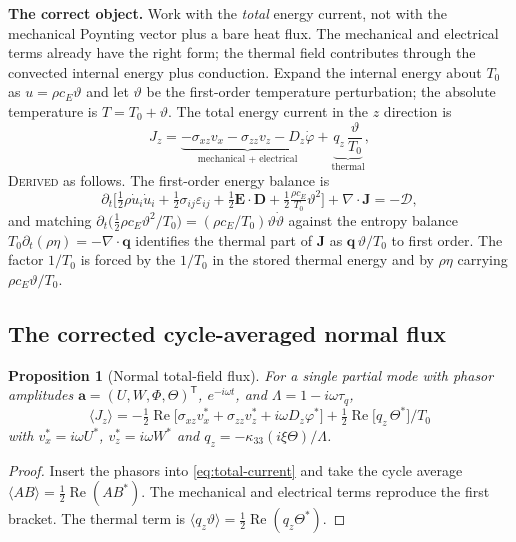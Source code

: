\documentclass[11pt]{article}
\newcommand{\s}{\sigma}
\newcommand{\eps}{\varepsilon}
\newcommand{\bth}{\vartheta}
\newcommand{\D}{\bm{D}}
\newcommand{\E}{\bm{E}}
\newcommand{\bq}{\bm{q}}
\newcommand{\Lam}{\Lambda}
\theoremstyle{plain}
\newtheorem{proposition}{Proposition}
\begin{document}
\textbf{The correct object.} Work with the \emph{total} energy current, not with
the mechanical Poynting vector plus a bare heat flux. The mechanical and
electrical terms already have the right form; the thermal field contributes
through the convected internal energy plus conduction. Expand the internal energy
about $T_0$ as $u = \rho c_E\bth$ and let $\bth$ be the first-order temperature
perturbation; the absolute temperature is $T=T_0+\bth$. The total energy current
in the $z$ direction is
\begin{equation}
  J_z = \underbrace{-\s_{xz}v_x-\s_{zz}v_z-D_z\dot\varphi}_{\text{mechanical + electrical}}
      + \underbrace{q_z\,\frac{\bth}{T_0}}_{\text{thermal}},
  \label{eq:total-current}
\end{equation}
\textsc{Derived} as follows. The first-order energy balance is
\begin{equation}
  \partial_t\Big[\tfrac12\rho\dot u_i\dot u_i+\tfrac12\s_{ij}\eps_{ij}
    +\tfrac12\E\cdot\D+\tfrac12\tfrac{\rho c_E}{T_0}\bth^2\Big]
  +\nabla\cdot\bm{J} = -\mathcal{D},
  \label{eq:local-balance}
\end{equation}
and matching $\partial_t\big(\tfrac12\rho c_E\bth^2/T_0\big)
= (\rho c_E/T_0)\bth\dot\bth$ against the entropy balance
$T_0\partial_t(\rho\eta)=-\nabla\cdot\bq$ identifies the thermal part of $\bm{J}$
as $\bq\,\bth/T_0$ to first order. The factor $1/T_0$ is forced by the
$1/T_0$ in the stored thermal energy and by $\rho\eta$ carrying $\rho c_E\bth/T_0$.

\subsection{The corrected cycle-averaged normal flux}

\begin{proposition}[Normal total-field flux]
\label{prop:flux}
For a single partial mode with phasor amplitudes
$\bm{a}=(U,W,\Phi,\Theta)^{\mathsf T}$, $e^{-i\omega t}$, and
$\Lam=1-i\omega\tau_q$,
\begin{equation}
  \boxed{\ \langle J_z\rangle
  = -\tfrac12\operatorname{Re}\big[\s_{xz}v_x^{*}+\s_{zz}v_z^{*}
    +i\omega D_z\varphi^{*}\big]
  +\tfrac12\operatorname{Re}\big[q_z\,\Theta^{*}\big]\big/T_0\ }
  \label{eq:Jz}
\end{equation}
with $v_x^{*}=i\omega U^{*}$, $v_z^{*}=i\omega W^{*}$ and
$q_z=-\kappa_{33}(i\xi\Theta)/\Lam$.
\end{proposition}
\begin{proof}
Insert the phasors into \eqref{eq:total-current} and take the cycle average
$\langle AB\rangle=\tfrac12\operatorname{Re}(AB^*)$. The mechanical and
electrical terms reproduce the first bracket. The thermal term is
$\langle q_z\bth\rangle=\tfrac12\operatorname{Re}(q_z\Theta^*)$.
\end{proof}
\end{document}
